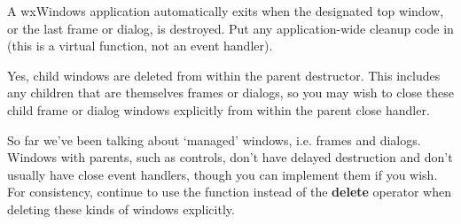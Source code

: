 
A wxWindows application automatically exits when the designated top window, or the
last frame or dialog, is destroyed. Put any application-wide cleanup code in  (this
is a virtual function, not an event handler).


Yes, child windows are deleted from within the parent destructor. This includes any children
that are themselves frames or dialogs, so you may wish to close these child frame or dialog windows
explicitly from within the parent close handler.


So far we've been talking about `managed' windows, i.e. frames and dialogs. Windows
with parents, such as controls, don't have delayed destruction and don't usually have
close event handlers, though you can implement them if you wish. For consistency,
continue to use the  function instead
of the {\bf delete} operator when deleting these kinds of windows explicitly.

